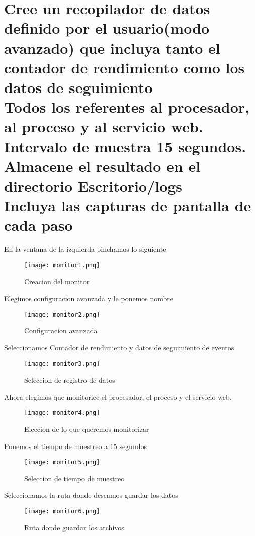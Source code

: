 \section{Cree un recopilador de datos definido por el usuario(modo avanzado) que incluya tanto el contador de rendimiento como los datos de seguimiento \\Todos los referentes al procesador, al proceso y al servicio web.\\    Intervalo de muestra 15 segundos.\\Almacene el resultado en el directorio Escritorio/logs \\Incluya las capturas de pantalla de cada paso}
En la ventana de la izquierda pinchamos lo siguiente
\begin{figure}[H] 
\centering
\texttt{[image: monitor1.png]}  
\label{figura9:}
\caption{Creacion del monitor}
\end{figure}
Elegimos configuracion avanzada y le ponemos nombre
\begin{figure}[H] 
\centering
\texttt{[image: monitor2.png]}  
\label{figura10:}
\caption{Configuracion avanzada}
\end{figure}
Seleccionamos Contador de rendimiento y datos de seguimiento de eventos
\begin{figure}[H] 
\centering
\texttt{[image: monitor3.png]}
\label{figura11:}
\caption{Seleccion de registro de datos}
\end{figure}
Ahora elegimos que monitorice el procesador, el proceso y el servicio web.
\begin{figure}[H] 
\centering
\texttt{[image: monitor4.png]}  
\label{figura12:}
\caption{Eleccion de lo que queremos monitorizar}
\end{figure}
Ponemos el tiempo de muestreo a 15 segundos
\begin{figure}[H] 
\centering
\texttt{[image: monitor5.png]}  
\label{figura13:}
\caption{Seleccion de tiempo de muestreo}
\end{figure}
Seleccionamos la ruta donde deseamos guardar los datos
\begin{figure}[H] 
\centering
\texttt{[image: monitor6.png]}  
\label{figura14:}
\caption{Ruta donde guardar los archivos}
\end{figure}
